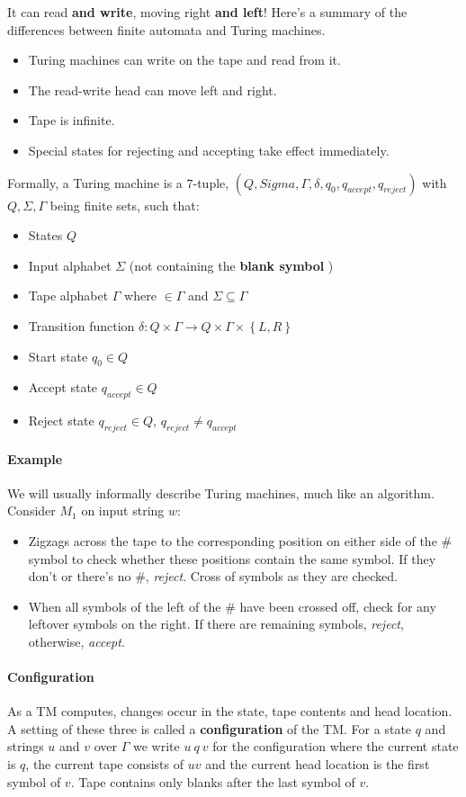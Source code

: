 \documentclass[12 pt]{article}
\begin{document}
It can read \textbf{and write}, moving right \textbf{and left}! Here's
a summary of the differences between finite automata and Turing
machines.
\begin{itemize}
\item Turing machines can write on the tape and read from it.
\item The read-write head can move left and right.
\item Tape is infinite.
\item Special states for rejecting and accepting take effect immediately.
\end{itemize}
Formally, a Turing machine is a $7$-tuple, $(Q, Sigma, \Gamma, \delta,
q_0, q_{accept}, q_{reject})$ with $Q, \Sigma, \Gamma$ being finite
sets, such that:
\begin{itemize}
\item States $Q$
\item Input alphabet $\Sigma$ (not containing the \textbf{blank
    symbol} \textvisiblespace)
\item Tape alphabet $\Gamma$ where \textvisiblespace $\in \Gamma$ and
  $\Sigma \subseteq \Gamma$
\item Transition function $\delta: Q \times \Gamma \to Q \times \Gamma
  \times \left\{L, R\right\}$
\item Start state $q_0 \in Q$
\item Accept state $q_{accept} \in Q$
\item Reject state $q_{reject} \in Q$, $q_{reject} \neq q_{accept}$
\end{itemize}
\paragraph{Example} We will usually informally describe Turing
machines, much like an algorithm. Consider $M_1$ on input string $w$:
\begin{itemize}
\item Zigzags across the tape to the corresponding position on either
  side of the $\#$ symbol to check whether these positions contain the
  same symbol. If they don't or there's no $\#$,
  \textit{reject}. Cross of symbols as they are checked.
\item When all symbols of the left of the $\#$ have been crossed off,
  check for any leftover symbols on the right. If there are remaining
  symbols, \textit{reject}, otherwise, \textit{accept}.
\end{itemize}
\paragraph{Configuration}
As a TM computes, changes occur in the state, tape contents and head
location. A setting of these three is called a \textbf{configuration}
of the TM. For a state $q$ and strings $u$ and $v$ over $\Gamma$ we
write $u\ q \ v$ for the configuration where the current state is $q$,
the current tape consists of $uv$ and the current head location is the
first symbol of $v$. Tape contains only blanks after the last symbol
of $v$.
\end{document}

